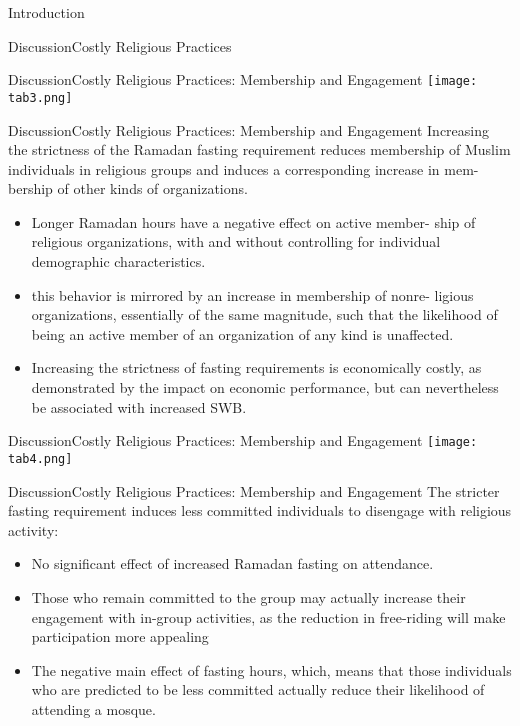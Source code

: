 \documentclass[pdftex,12pt,xcolor=pdftex,table]{beamer}
\begin{document}
\begin{frame}{Introduction}
\begin{frame}{Discussion}{Costly Religious Practices}
    \end{frame}


    \begin{frame}{Discussion}{Costly Religious Practices: Membership and Engagement}
    \vspace{0.0cm}
    \centering\texttt{[image: tab3.png]}

    \end{frame}


    \begin{frame}{Discussion}{Costly Religious Practices: Membership and Engagement}
    Increasing the strictness of the Ramadan fasting requirement reduces membership of Muslim individuals in religious groups and induces a corresponding increase in mem- bership of other kinds of organizations.
    \begin{itemize}
        \item<2-> Longer Ramadan hours have a negative effect on active member- ship of religious organizations, with and without controlling for individual demographic characteristics.
        \item<3-> this behavior is mirrored by an increase in membership of nonre- ligious organizations, essentially of the same magnitude, such that the likelihood of being an active member of an organization of any kind is unaffected. 
        \item<4-> Increasing the strictness of fasting requirements is economically costly, as demonstrated by the impact on economic performance, but can nevertheless be associated with increased SWB.
      \end{itemize}
    \end{frame}


    \begin{frame}{Discussion}{Costly Religious Practices: Membership and Engagement}
    \vspace{-0.5cm}
    \centering\texttt{[image: tab4.png]}

    \end{frame}
    

    \begin{frame}{Discussion}{Costly Religious Practices: Membership and Engagement}
    The stricter fasting requirement induces less committed individuals to disengage with religious activity: 
    \begin{itemize}
        \item<2-> No significant effect of increased Ramadan fasting on attendance.
        \item<3-> Those who remain committed to the group may actually increase their engagement with in-group activities, as the reduction in free-riding will make participation more appealing 
        \item<4-> The negative main effect of fasting hours, which,  means that those individuals who are predicted to be less committed actually reduce their likelihood of attending a mosque.
        

\end{itemize}
\end{frame}
\end{frame}
\end{document}
